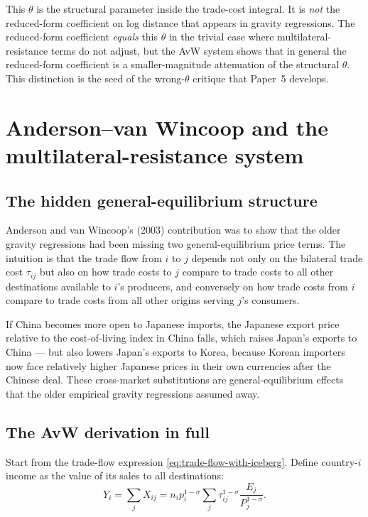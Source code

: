 \documentclass[11pt,letterpaper,oneside]{book}
\theoremstyle{definition}
\theoremstyle{remark}
\begin{document}
\begin{tcolorbox}[warning]
This $\theta$ is the structural parameter inside the trade-cost integral. It is \emph{not} the reduced-form coefficient on log distance that appears in gravity regressions. The reduced-form coefficient \emph{equals} this $\theta$ in the trivial case where multilateral-resistance terms do not adjust, but the AvW system shows that in general the reduced-form coefficient is a smaller-magnitude attenuation of the structural $\theta$. This distinction is the seed of the wrong-$\theta$ critique that Paper~5 develops.
\end{tcolorbox}

\chapter{Anderson--van Wincoop and the multilateral-resistance system}

\section{The hidden general-equilibrium structure}

Anderson and van Wincoop's (2003) contribution was to show that the older gravity regressions had been missing two general-equilibrium price terms. The intuition is that the trade flow from $i$ to $j$ depends not only on the bilateral trade cost $\tau_{ij}$ but also on how trade costs to $j$ compare to trade costs to all other destinations available to $i$'s producers, and conversely on how trade costs from $i$ compare to trade costs from all other origins serving $j$'s consumers.

If China becomes more open to Japanese imports, the Japanese export price relative to the cost-of-living index in China falls, which raises Japan's exports to China --- but also lowers Japan's exports to Korea, because Korean importers now face relatively higher Japanese prices in their own currencies after the Chinese deal. These cross-market substitutions are general-equilibrium effects that the older empirical gravity regressions assumed away.

\section{The AvW derivation in full}

Start from the trade-flow expression \eqref{eq:trade-flow-with-iceberg}. Define country-$i$ income as the value of its sales to all destinations:
\begin{equation}
Y_i = \sum_j X_{ij} = n_i p_i^{1-\sigma} \sum_j \tau_{ij}^{1-\sigma} \frac{E_j}{P_j^{1-\sigma}}.
\label{eq:income-aggregation}
\end{equation}
\end{document}
